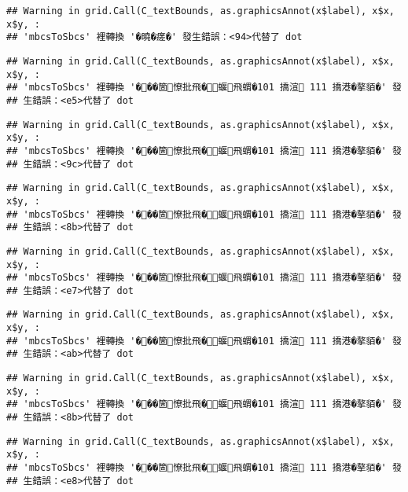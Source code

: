\documentclass[
]{article}
\begin{document}
\begin{verbatim}
## Warning in grid.Call(C_textBounds, as.graphicsAnnot(x$label), x$x, x$y, :
## 'mbcsToSbcs' 裡轉換 '�曉�瘥�' 發生錯誤：<94>代替了 dot
\end{verbatim}

\begin{verbatim}
## Warning in grid.Call(C_textBounds, as.graphicsAnnot(x$label), x$x, x$y, :
## 'mbcsToSbcs' 裡轉換 '���箇憭批飛�蝘飛蝟�101 撟渲 111 撟港�摮貊�' 發
## 生錯誤：<e5>代替了 dot
\end{verbatim}

\begin{verbatim}
## Warning in grid.Call(C_textBounds, as.graphicsAnnot(x$label), x$x, x$y, :
## 'mbcsToSbcs' 裡轉換 '���箇憭批飛�蝘飛蝟�101 撟渲 111 撟港�摮貊�' 發
## 生錯誤：<9c>代替了 dot
\end{verbatim}

\begin{verbatim}
## Warning in grid.Call(C_textBounds, as.graphicsAnnot(x$label), x$x, x$y, :
## 'mbcsToSbcs' 裡轉換 '���箇憭批飛�蝘飛蝟�101 撟渲 111 撟港�摮貊�' 發
## 生錯誤：<8b>代替了 dot
\end{verbatim}

\begin{verbatim}
## Warning in grid.Call(C_textBounds, as.graphicsAnnot(x$label), x$x, x$y, :
## 'mbcsToSbcs' 裡轉換 '���箇憭批飛�蝘飛蝟�101 撟渲 111 撟港�摮貊�' 發
## 生錯誤：<e7>代替了 dot
\end{verbatim}

\begin{verbatim}
## Warning in grid.Call(C_textBounds, as.graphicsAnnot(x$label), x$x, x$y, :
## 'mbcsToSbcs' 裡轉換 '���箇憭批飛�蝘飛蝟�101 撟渲 111 撟港�摮貊�' 發
## 生錯誤：<ab>代替了 dot
\end{verbatim}

\begin{verbatim}
## Warning in grid.Call(C_textBounds, as.graphicsAnnot(x$label), x$x, x$y, :
## 'mbcsToSbcs' 裡轉換 '���箇憭批飛�蝘飛蝟�101 撟渲 111 撟港�摮貊�' 發
## 生錯誤：<8b>代替了 dot
\end{verbatim}

\begin{verbatim}
## Warning in grid.Call(C_textBounds, as.graphicsAnnot(x$label), x$x, x$y, :
## 'mbcsToSbcs' 裡轉換 '���箇憭批飛�蝘飛蝟�101 撟渲 111 撟港�摮貊�' 發
## 生錯誤：<e8>代替了 dot
\end{verbatim}
\end{document}
